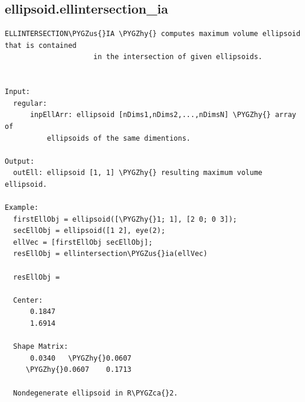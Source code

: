 \documentclass[letterpaper,10pt,english]{sphinxmanual}
\def\PYGZus{\char`\_}
\def\PYGZca{\char`\^}
\def\PYGZhy{\char`\-}
\begin{document}
\subsection{ellipsoid.ellintersection\_ia}
\label{chap_functions:ellipsoid-ellintersection-ia}
\begin{Verbatim}[commandchars=\\\{\}]
ELLINTERSECTION\PYGZus{}IA \PYGZhy{} computes maximum volume ellipsoid that is contained
                     in the intersection of given ellipsoids.


Input:
  regular:
      inpEllArr: ellipsoid [nDims1,nDims2,...,nDimsN] \PYGZhy{} array of
          ellipsoids of the same dimentions.

Output:
  outEll: ellipsoid [1, 1] \PYGZhy{} resulting maximum volume ellipsoid.

Example:
  firstEllObj = ellipsoid([\PYGZhy{}1; 1], [2 0; 0 3]);
  secEllObj = ellipsoid([1 2], eye(2);
  ellVec = [firstEllObj secEllObj];
  resEllObj = ellintersection\PYGZus{}ia(ellVec)

  resEllObj =

  Center:
      0.1847
      1.6914

  Shape Matrix:
      0.0340   \PYGZhy{}0.0607
     \PYGZhy{}0.0607    0.1713

  Nondegenerate ellipsoid in R\PYGZca{}2.
\end{Verbatim}
\end{document}
